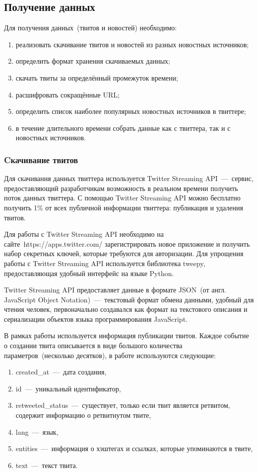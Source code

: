 \subsection{Получение данных}
    Для получения данных~(твитов и новостей) необходимо:
    \begin{enumerate}
        \item реализовать скачивание твитов и новостей из разных новостных источников;
        \item определить формат хранения скачиваемых данных;
        \item скачать твиты за определённый промежуток времени;
        \item расшифровать сокращённые URL;
        \item определить список наиболее популярных новостных источников в твиттере;
        \item в течение длительного времени собрать данные как с твиттера, так и с новостных источников.
    \end{enumerate}

    \subsubsection{Cкачивание твитов}
        Для скачивания данных твиттера используется Twitter Streaming API~---~сервис,
        предоставляющий разработчикам возможность в реальном времени получить поток данных твиттера.
        С помощью Twitter Streaming API можно бесплатно получить 1\% от всех публичной информации твиттера: публикация и удаления твитов.

        Для работы с Twitter Streaming API необходимо на сайте~https://apps.twitter.com/ зарегистрировать новое приложение и получить набор секретных ключей,
        которые требуются для авторизации.
        Для упрощения работы с Twitter Streaming API используется библиотека tweepy, предоставляющая удобный интерфейс на языке Python.

        Twitter Streaming API предоставляет данные в формате JSON~(от англ. JavaScript Object Notation)~---~текстовый формат обмена данными, удобный для чтения человек,
        первоначально создавался как формат на текстового описания и сериализации объектов языка программирования JavaScript.

        В рамках работы используется информация публикации твитов.
        Каждое событие о создании твита описывается в виде большого количества параметров~(несколько десятков), в работе используются следующие:
        \begin{enumerate}
            \item created\_at~---~дата создания,
            \item id~---~уникальный идентификатор,
            \item retweeted\_status~---~существует, только если твит является ретвитом, содержит информацию о ретвитнутом твите,
            \item lang~---~язык,
            \item entities~---~информация о хэштегах и ссылках, которые упоминаются  в твите,
            \item text~---~текст твита.
        \end{enumerate}

